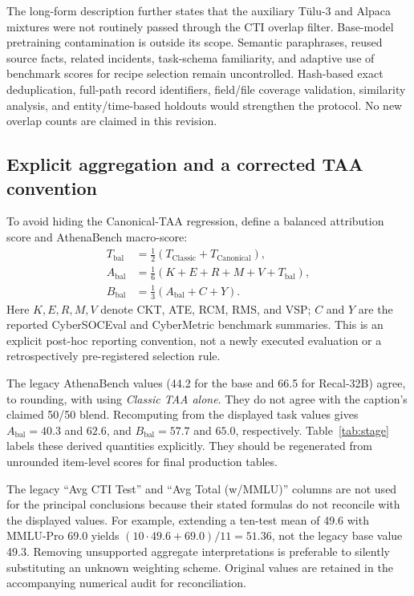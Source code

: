 \documentclass[journal]{IEEEtran}
\begin{document}
The long-form description further states that the auxiliary T\"ulu-3 and Alpaca mixtures were not routinely passed through the CTI overlap filter. Base-model pretraining contamination is outside its scope. Semantic paraphrases, reused source facts, related incidents, task-schema familiarity, and adaptive use of benchmark scores for recipe selection remain uncontrolled. Hash-based exact deduplication, full-path record identifiers, field/file coverage validation, similarity analysis, and entity/time-based holdouts would strengthen the protocol. No new overlap counts are claimed in this revision.

\subsection{Explicit aggregation and a corrected TAA convention}\label{sec:aggregation}
To avoid hiding the Canonical-TAA regression, define a balanced attribution score and AthenaBench macro-score:
\begin{align}
 T_{\mathrm{bal}} &= \tfrac12(T_{\mathrm{Classic}}+T_{\mathrm{Canonical}}),\\
 A_{\mathrm{bal}} &= \tfrac16(K+E+R+M+V+T_{\mathrm{bal}}),\\
 B_{\mathrm{bal}} &= \tfrac13(A_{\mathrm{bal}}+C+Y).
\end{align}
Here $K,E,R,M,V$ denote CKT, ATE, RCM, RMS, and VSP; $C$ and $Y$ are the reported CyberSOCEval and CyberMetric benchmark summaries. This is an explicit post-hoc reporting convention, not a newly executed evaluation or a retrospectively pre-registered selection rule.

The legacy AthenaBench values (44.2 for the base and 66.5 for Recal-32B) agree, to rounding, with using \emph{Classic TAA alone}. They do not agree with the caption's claimed 50/50 blend. Recomputing from the displayed task values gives $A_{\mathrm{bal}}=40.3$ and $62.6$, and $B_{\mathrm{bal}}=57.7$ and $65.0$, respectively. Table~\ref{tab:stage} labels these derived quantities explicitly. They should be regenerated from unrounded item-level scores for final production tables.

The legacy ``Avg CTI Test'' and ``Avg Total (w/MMLU)'' columns are not used for the principal conclusions because their stated formulas do not reconcile with the displayed values. For example, extending a ten-test mean of 49.6 with MMLU-Pro 69.0 yields $(10\cdot49.6+69.0)/11=51.36$, not the legacy base value 49.3. Removing unsupported aggregate interpretations is preferable to silently substituting an unknown weighting scheme. Original values are retained in the accompanying numerical audit for reconciliation.
\end{document}
